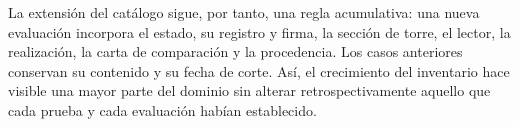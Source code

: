 La extensión del catálogo sigue, por tanto, una regla acumulativa:
una nueva evaluación incorpora el estado, su registro y firma, la sección
de torre, el lector, la realización, la carta de comparación y la
procedencia. Los casos anteriores conservan su contenido y su fecha de
corte. Así, el crecimiento del inventario hace visible una mayor parte
del dominio sin alterar retrospectivamente aquello que cada prueba y
cada evaluación habían establecido.
